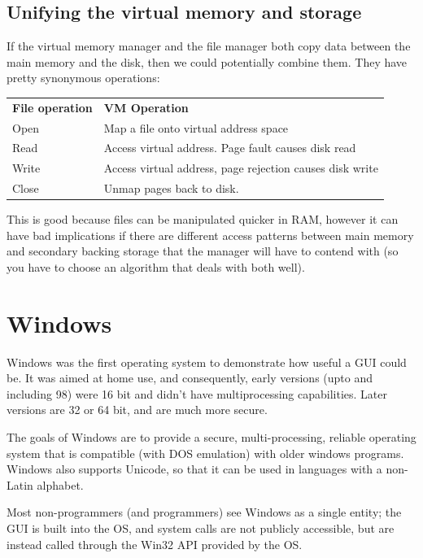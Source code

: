 \subsection{Unifying the virtual memory and storage}

If the virtual memory manager and the file manager both copy data between the
main memory and the disk, then we could potentially combine them. They have
pretty synonymous operations:

\begin{center}
  \begin{tabularx}{\textwidth}{lX}
    \textbf{File operation} & \textbf{VM Operation}\\
    Open & Map a file onto virtual address space\\
    Read & Access virtual address. Page fault causes disk read\\
    Write & Access virtual address, page rejection causes disk write\\
    Close & Unmap pages back to disk.
  \end{tabularx}
\end{center}

This is good because files can be manipulated quicker in RAM, however it can
have bad implications if there are different access patterns between main memory
and secondary backing storage that the manager will have to contend with (so you
have to choose an algorithm that deals with both well).

\section{Windows}

Windows was the first operating system to demonstrate how useful a GUI could be.
It was aimed at home use, and consequently, early versions (upto and including
98) were 16 bit and didn't have multiprocessing capabilities. Later versions are
32 or 64 bit, and are much more secure.

The goals of Windows are to provide a secure, multi-processing, reliable
operating system that is compatible (with DOS emulation) with older windows
programs. Windows also supports Unicode, so that it can be used in languages
with a non-Latin alphabet.

Most non-programmers (and programmers) see Windows as a single entity; the GUI
is built into the OS, and system calls are not publicly accessible, but are
instead called through the Win32 API provided by the OS.

